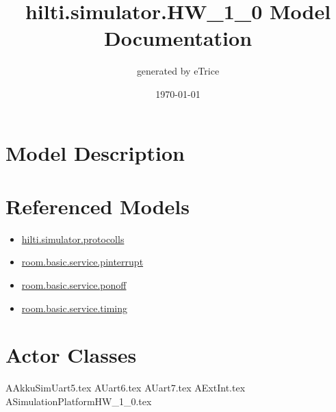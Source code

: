 \documentclass[titlepage]{article}
\title{hilti.simulator.HW\_1\_0 Model Documentation}
\date{\today}
\author{generated by eTrice}
\begin{document}
\pagestyle{plain}
\maketitle
\tableofcontents

\newpage
\listoffigures
\newpage
\section{Model Description}

\section{Referenced Models}

\begin{itemize}
\item \href{hilti.simulator.protocolls.pdf}{hilti.simulator.protocolls}
\item \href{room.basic.service.pinterrupt.pdf}{room.basic.service.pinterrupt}
\item \href{room.basic.service.ponoff.pdf}{room.basic.service.ponoff}
\item \href{room.basic.service.timing.pdf}{room.basic.service.timing}
\end{itemize}
\newpage






\section{Actor Classes}
{AAkkuSimUart5.tex}
{AUart6.tex}
{AUart7.tex}
{AExtInt.tex}
{ASimulationPlatformHW_1_0.tex}
\end{document}
